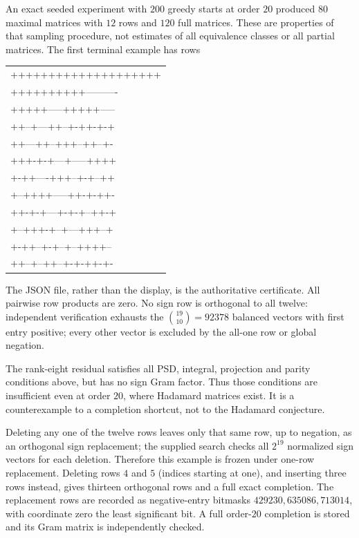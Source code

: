 \documentclass[11pt]{article}
\begin{document}
An exact seeded experiment with $200$ greedy starts at order $20$
produced $80$ maximal matrices with $12$ rows and $120$ full matrices.
These are properties of that sampling procedure, not estimates of all
equivalence classes or all partial matrices. The first terminal example
has rows
\begin{center}\small\ttfamily
\begin{tabular}{l}
++++++++++++++++++++\\
++++++++++----------\\
+++++-----+++++-----\\
++--+---++--+-++-+-+\\
++---++--+++--++--+-\\
+++-+-+---+-----++++\\
+-++----+++--+-+--++\\
+--++++-----++-+-++-\\
++-+-+---+-+-+--++-+\\
+--+++-+--+---+++--+\\
+-++--+-+--+--++++--\\
++--+--++--+-+-++-+-
\end{tabular}
\end{center}
The JSON file, rather than the display, is the authoritative certificate.
All pairwise row products are zero. No sign row is orthogonal to all
twelve: independent verification exhausts the $\binom{19}{10}=92378$
balanced vectors with first entry positive; every other vector is
excluded by the all-one row or global negation.

The rank-eight residual satisfies all PSD, integral, projection and
parity conditions above, but has no sign Gram factor. Thus those
conditions are insufficient even at order $20$, where Hadamard matrices
exist. It is a counterexample to a completion shortcut, not to the
Hadamard conjecture.

Deleting any one of the twelve rows leaves only that same row, up to
negation, as an orthogonal sign replacement; the supplied search checks
all $2^{19}$ normalized sign vectors for each deletion. Therefore this
example is frozen under one-row replacement. Deleting rows $4$ and $5$
(indices starting at one), and inserting three rows instead, gives
thirteen orthogonal rows and a full exact completion. The replacement
rows are recorded as negative-entry bitmasks $429230,635086,713014$,
with coordinate zero the least significant bit. A full order-$20$
completion is stored and its Gram matrix is independently checked.
\end{document}
